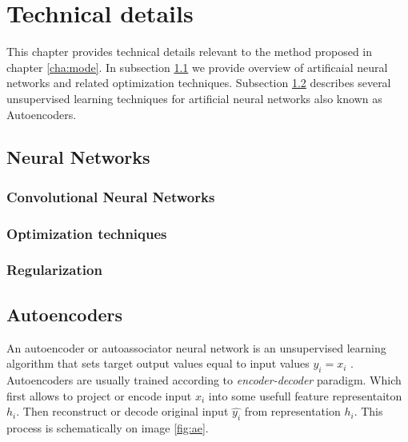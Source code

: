 
\chapter{Technical details}
\label{cha:tede}

This chapter provides technical details relevant to the method proposed in chapter \ref{cha:mode}.
In subsection \ref{cha:nn} we provide overview of artificaial neural networks and related optimization techniques.
Subsection \ref{cha:ae} describes several unsupervised learning techniques for artificial neural networks also known as Autoencoders.

\section{Neural Networks}
\label{cha:nn}

\subsection{Convolutional Neural Networks}
\label{cha:cnn}

\subsection{Optimization techniques}
\subsection{Regularization}






\section{Autoencoders}\label{cha:ae}
An autoencoder or autoassociator neural network is an unsupervised learning algorithm that sets target output values equal to input values $y_i=x_i$ \cite{Ng2011,RanzatoMarcAurelio2007}.
Autoencoders are usually trained according to \textit{encoder-decoder} paradigm.
Which first allows to project or encode input $x_i$ into some usefull feature representaiton $h_i$.
Then reconstruct or decode original input $\hat{y_i}$ from representation $h_i$.
This process is schematically on image \ref{fig:ae}.

